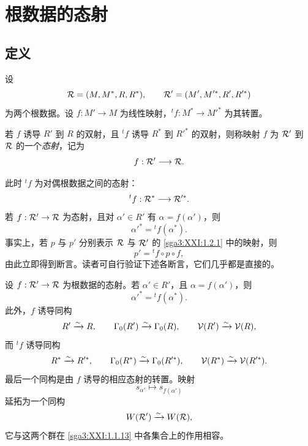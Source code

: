 
\section{根数据的态射}\label{sga3:XXI:6}
\renewcommand{\thetheorem}{\thesubsection.\arabic{theorem}}

\subsection{定义}\label{sga3:XXI:6.1}

设
\[
 \mathcal{R}=(M,M^\ast,R,R^\ast),
 \qquad
 \mathcal{R}'=(M',M'^\ast,R',R'^\ast)
\]
为两个根数据。设 \(f:M'\to M\) 为线性映射，\({}^tf:M^\ast\to M'^\ast\) 为其转置。

\begin{definition}\label{sga3:XXI:6.1.1}
若 \(f\) 诱导 \(R'\) 到 \(R\) 的双射，且 \({}^tf\) 诱导 \(R^\ast\) 到 \(R'^\ast\) 的双射，则称映射 \(f\) 为 \(\mathcal{R}'\) 到 \(\mathcal{R}\) 的一个\emph{态射}，记为
\[
 f:\mathcal{R}'\longrightarrow\mathcal{R}.
\]
\end{definition}

此时 \({}^tf\) 为对偶根数据之间的态射：
\[
 {}^tf:\mathcal{R}^\ast\longrightarrow\mathcal{R}'^\ast.
\]
若 \(f:\mathcal{R}'\to\mathcal{R}\) 为态射，且对 \(\alpha'\in R'\) 有 \(\alpha=f(\alpha')\)，则
\[
 \alpha'^\ast={}^tf(\alpha^\ast).
\]
事实上，若 \(p\) 与 \(p'\) 分别表示 \(\mathcal{R}\) 与 \(\mathcal{R}'\) 的 \ref{sga3:XXI:1.2.1} 中的映射，则
\[
 p'={}^tf\circ p\circ f,
\]
由此立即得到断言。读者可自行验证下述各断言，它们几乎都是直接的。

\begin{proposition}\label{sga3:XXI:6.1.2}
设 \(f:\mathcal{R}'\to\mathcal{R}\) 为根数据的态射。若 \(\alpha'\in R'\)，且 \(\alpha=f(\alpha')\)，则
\[
 \alpha'^\ast={}^tf(\alpha^\ast).
\]
此外，\(f\) 诱导同构
\[
 R'\xrightarrow{\sim}R,\qquad
 \Gamma_0(R')\xrightarrow{\sim}\Gamma_0(R),\qquad
 \mathcal{V}(R')\xrightarrow{\sim}\mathcal{V}(R),
\]
而 \({}^tf\) 诱导同构
\[
 R^\ast\xrightarrow{\sim}R'^\ast,\qquad
 \Gamma_0(R^\ast)\xrightarrow{\sim}\Gamma_0(R'^\ast),\qquad
 \mathcal{V}(R^\ast)\xrightarrow{\sim}\mathcal{V}(R'^\ast).
\]
最后一个同构是由 \(f\) 诱导的相应态射的转置。映射
\[
 s_{\alpha'}\longmapsto s_{f(\alpha')}
\]
延拓为一个同构
\[
 W(\mathcal{R}')\xrightarrow{\sim}W(\mathcal{R}),
\]
它与这两个群在 \ref{sga3:XXI:1.1.13} 中各集合上的作用相容。
\end{proposition}

